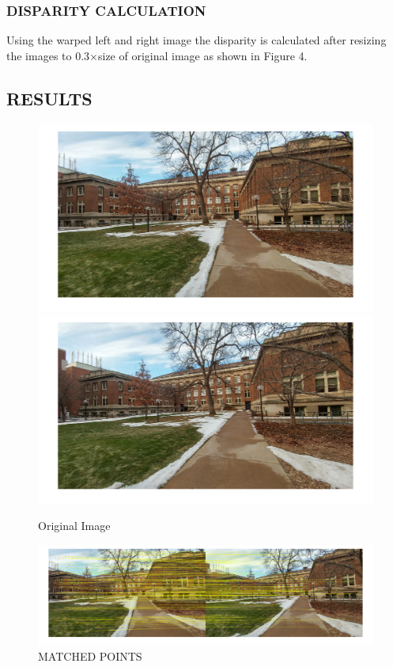 \documentclass[letter, 10pt]{article}
\begin{document}
\subsubsection*{DISPARITY CALCULATION}
Using the warped left and right image the disparity is calculated after resizing the images to 0.3$\times$size of original image as shown in Figure 4.

\subsection*{RESULTS}

\begin{figure}[H]
        \centering
        \includegraphics[width=\textwidth]{HW5/RESULT/im1.png}
    \endminipage\hfill
        \centering
        \includegraphics[width=\textwidth]{HW5/RESULT/im2.png}
    \endminipage\hfill
    \caption{Original Image}
\end{figure}

\begin{figure}[H]
    \centering
    \includegraphics[width=\textwidth]{HW5/RESULT/matched_points.png}
    \caption{MATCHED POINTS}
    \label{fig:my_label}
\end{figure}
\end{document}
